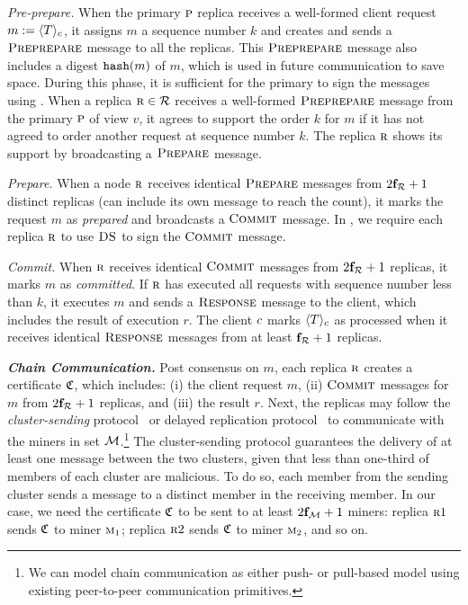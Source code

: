 {\em Pre-prepare.} 
When the primary $\textsc{p}{}$ replica receives a well-formed client request 
$m := \SignMessage{\Transaction}{\Client{}}$, it assigns $m$ a sequence number 
$k$ and creates and sends a $\textsc{Preprepare}$ message to all the replicas.
This $\textsc{Preprepare}$ message also includes a digest $\texttt{hash}(m)$ of $m$, 
which is used in future communication to save space. During this phase, it is 
sufficient for the primary to sign the messages using \MAC{}.
%
When a replica $\textsc{r}{} \in \mathcal{R}{}$ receives a well-formed 
$\textsc{Preprepare}$ message from the primary $\textsc{p}{}$ of view $v$, it agrees 
to support the order $k$ for $m$ if it has not agreed to order another request 
at sequence number $k$. The replica $\textsc{r}$ shows its support by broadcasting 
a $\textsc{Prepare}$ message.

{\em Prepare.}
When a node $\textsc{r}{}$ receives identical $\textsc{Prepare}$ messages from 
$2\mathbf{f}_{\mathcal{R}{}}+1$ distinct replicas (can include its own message to reach the 
count), it marks the request $m$ as {\em prepared} and broadcasts a $\textsc{Commit}$ 
message. In \DualChain, we require each replica $\textsc{r}{}$ to use $\textsc{DS}$ 
to sign the $\textsc{Commit}$ message.

{\em Commit.}
When $\textsc{r}{}$ receives identical $\textsc{Commit}$ messages from 
$2\mathbf{f}_{\mathcal{R}{}}+1$ replicas, it marks $m$ as {\em committed}. If $\textsc{r}{}$ 
has executed all requests with sequence number less than $k$, it executes $m$ and 
sends a $\textsc{Response}$ message to the client, which includes the result of 
execution $r$. The client $\Client$ marks $\SignMessage{\Transaction}{\Client{}}$ 
as processed when it receives identical $\textsc{Response}$ messages from at least 
$\mathbf{f}_{\mathcal{R}{}}+1$ replicas.

{\bf \em Chain Communication.} 
Post consensus on $m$, each replica $\textsc{r}$ creates a certificate $\mathfrak{C}$, 
which includes: 
(i) the client request $m$,
(ii) $\textsc{Commit}$ messages for $m$ from $2\mathbf{f}_{\mathcal{R}{}}+1$ replicas, and
(iii) the result $r$.
Next, the replicas may follow the {\em cluster-sending} protocol~\cite{byz-cluster-sending} 
or delayed replication protocol~\cite{delayedrepl} to communicate with the miners 
in set $\mathcal{M}$.\footnote{We can model chain communication as either push- or pull-based 
model using existing peer-to-peer communication primitives.} The cluster-sending 
protocol guarantees the delivery of at least one message between the two clusters, 
given that less than one-third of members of each cluster are malicious. To do so, 
each member from the sending cluster sends a message to a distinct member in the 
receiving member. In our case, we need the certificate $\mathfrak{C}$ to be sent to 
at least $2\mathbf{f}_{\mathcal{M}}+1$ miners: replica $\textsc{r}{1}$ sends $\mathfrak{C}$ to miner 
$\textsc{m}_{1}$; replica $\textsc{r}{2}$ sends $\mathfrak{C}$ to miner $\textsc{m}_{2}$, and 
so on.


